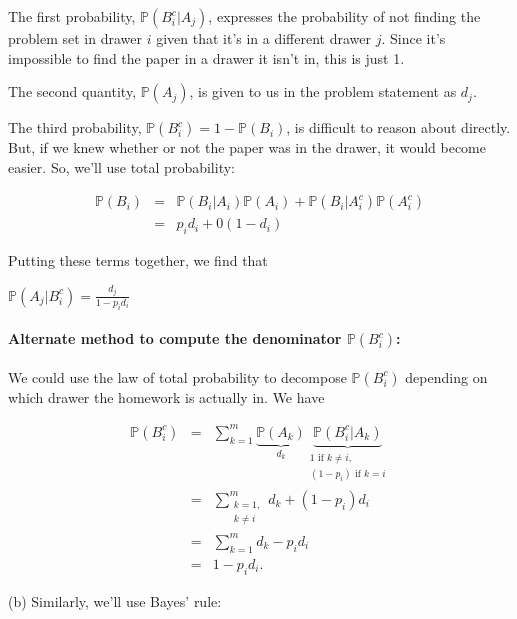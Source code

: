 \documentclass[6008notes.tex]{subfiles}
\begin{document}
The first probability, $\mathbb {P}(B_ i^ c | A_ j)$, expresses the probability of not finding the problem set in drawer $i$ given that it's in a different drawer $j$. Since it's impossible to find the paper in a drawer it isn't in, this is just 1.

The second quantity, $\mathbb {P}(A_ j)$, is given to us in the problem statement as $d_j$.

The third probability, $\mathbb {P}(B_ i^ c) = 1-\mathbb {P}(B_ i)$, is difficult to reason about directly. But, if we knew whether or not the paper was in the drawer, it would become easier. So, we'll use total probability:

\begin{eqnarray*}
            \mathbb{P}(B_i) &=& \mathbb{P}(B_i|A_i)\mathbb{P}(A_i) + \mathbb{P}(B_i|A_i^c)\mathbb{P}(A_i^c) \\
            &=& p_i d_i + 0 (1-d_i)
\end{eqnarray*}

Putting these terms together, we find that

{\centering$\mathbb {P}(A_ j|B_ i^ c) = \frac{d_ j}{1-p_ i d_ i}$ \par}
 
\paragraph{Alternate method to compute the denominator $\mathbb {P}(B_ i^ c)$:} We could use the law of total probability to decompose $\mathbb {P}(B_ i^ c)$ depending on which drawer the homework is actually in. We have

\begin{eqnarray*}
        \mathbb{P}(B_i^c) &=& \sum_{k=1}^m
                       \underbrace{\mathbb{P}(A_k)}_{d_k}
                       \underbrace{\mathbb{P}(B_i^c|A_k)}_{\substack{1\text{ if }k\ne i,\\
                                                             (1-p_i)\text{ if }k=i}} \\
                  &=& \sum_{\substack{k=1,\\
                                     k\ne i}}^m d_k
                     + (1-p_i)d_i \\
                  &=& \sum_{k=1}^m d_k - p_i d_i \\
                  &=& 1 - p_i d_i.
\end{eqnarray*}

(b) Similarly, we'll use Bayes' rule:
\end{document}
